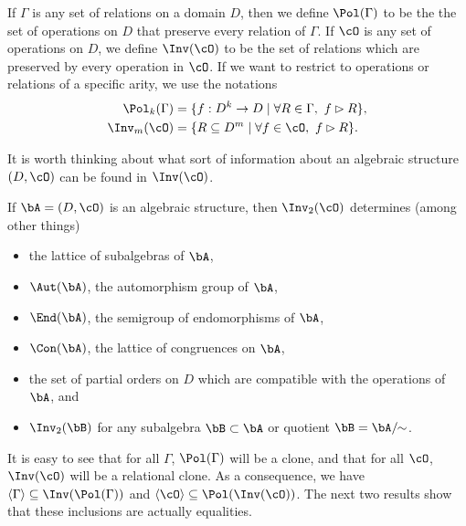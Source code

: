 \begin{defn} If $\Gamma$ is any set of relations on a domain $D$, then we define $\Pol(\Gamma)$ to be the the set of operations on $D$ that preserve every relation of $\Gamma$. If $\cO$ is any set of operations on $D$, we define $\Inv(\cO)$ to be the set of relations which are preserved by every operation in $\cO$. If we want to restrict to operations or relations of a specific arity, we use the notations
\begin{align*}
\Pol_k(\Gamma) &= \{f : D^k \rightarrow D \mid \forall R \in \Gamma,\ f \rhd R\},\\
\Inv_m(\cO) &= \{R \subseteq D^m \mid \forall f \in \cO,\ f \rhd R\}.
\end{align*}
\end{defn}

It is worth thinking about what sort of information about an algebraic structure $(D, \cO)$ can be found in $\Inv(\cO)$.

\begin{ex} If $\bA = (D, \cO)$ is an algebraic structure, then $\Inv_2(\cO)$ determines (among other things)
\begin{itemize}
\item the lattice of subalgebras of $\bA$,

\item $\Aut(\bA)$, the automorphism group of $\bA$,

\item $\End(\bA)$, the semigroup of endomorphisms of $\bA$,

\item $\Con(\bA)$, the lattice of congruences on $\bA$,

\item the set of partial orders on $D$ which are compatible with the operations of $\bA$, and

\item $\Inv_2(\bB)$ for any subalgebra $\bB \subset \bA$ or quotient $\bB = \bA/\!\!\sim$.
\end{itemize}
\end{ex}

It is easy to see that for all $\Gamma$, $\Pol(\Gamma)$ will be a clone, and that for all $\cO$, $\Inv(\cO)$ will be a relational clone. As a consequence, we have $\langle \Gamma \rangle \subseteq \Inv(\Pol(\Gamma))$ and $\langle \cO \rangle \subseteq \Pol(\Inv(\cO))$. The next two results show that these inclusions are actually equalities.

